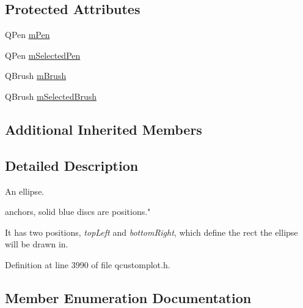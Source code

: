 \subsection*{Protected Attributes}
\begin{DoxyCompactItemize}
\item 
Q\+Pen \hyperlink{class_q_c_p_item_ellipse_a16ad9389acf028a7e4ac8fd7a550b2e4}{m\+Pen}
\item 
Q\+Pen \hyperlink{class_q_c_p_item_ellipse_a57b047abfce6f1a84ed46ca668c90e21}{m\+Selected\+Pen}
\item 
Q\+Brush \hyperlink{class_q_c_p_item_ellipse_a6fa59478cd3ad1b10e6c1f6cedc84bd6}{m\+Brush}
\item 
Q\+Brush \hyperlink{class_q_c_p_item_ellipse_a2e49d5547478aa36910ed8a2dcc8a5c0}{m\+Selected\+Brush}
\end{DoxyCompactItemize}
\subsection*{Additional Inherited Members}


\subsection{Detailed Description}
An ellipse. 

 anchors, solid blue discs are positions."

It has two positions, {\itshape top\+Left} and {\itshape bottom\+Right}, which define the rect the ellipse will be drawn in. 

Definition at line 3990 of file qcustomplot.\+h.



\subsection{Member Enumeration Documentation}
\hypertarget{class_q_c_p_item_ellipse_a415009889543169f35b70795f415e45e}{}
